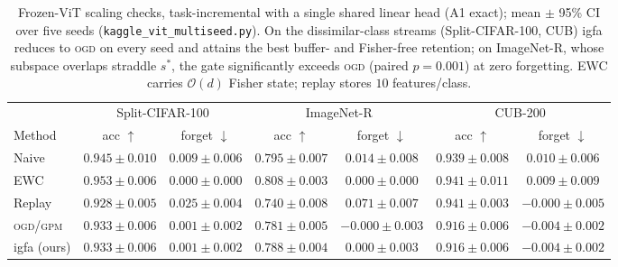 \documentclass[10pt,a4paper]{article}
\theoremstyle{plain}
\theoremstyle{definition}
\newcommand{\sstar}{s^{\ast}}
\newcommand{\IGFA}{igfa}
\newcommand{\OGD}{\textsc{ogd}}
\begin{document}
\begin{table}[tb]\centering\small
\setlength{\tabcolsep}{4pt}
\caption{Frozen-ViT scaling checks, task-incremental with a single shared linear head (A1
exact); mean $\pm$ 95\% CI over five seeds (\texttt{kaggle\_vit\_multiseed.py}). On the
dissimilar-class streams (Split-CIFAR-100, CUB) \IGFA{} reduces to \OGD{} on every seed and
attains the best buffer- and Fisher-free retention; on ImageNet-R, whose subspace overlaps
straddle $\sstar$, the gate significantly exceeds \OGD{} (paired $p=0.001$) at zero
forgetting. EWC carries $\mathcal O(d)$ Fisher state; replay stores $10$ features/class.}
\label{tab:cifar}
\begin{tabular}{lcccccc}
\toprule
 & \multicolumn{2}{c}{Split-CIFAR-100} & \multicolumn{2}{c}{ImageNet-R} & \multicolumn{2}{c}{CUB-200} \\
\cmidrule(lr){2-3}\cmidrule(lr){4-5}\cmidrule(lr){6-7}
Method & acc $\uparrow$ & forget $\downarrow$ & acc $\uparrow$ & forget $\downarrow$ & acc $\uparrow$ & forget $\downarrow$ \\
\midrule
Naive  & $0.945\pm0.010$ & $0.009\pm0.006$ & $0.795\pm0.007$ & $0.014\pm0.008$ & $0.939\pm0.008$ & $0.010\pm0.006$ \\
EWC \cite{kirkpatrick2017} & $0.953\pm0.006$ & $0.000\pm0.000$ & $0.808\pm0.003$ & $0.000\pm0.000$ & $0.941\pm0.011$ & $0.009\pm0.009$ \\
Replay & $0.928\pm0.005$ & $0.025\pm0.004$ & $0.740\pm0.008$ & $0.071\pm0.007$ & $0.941\pm0.003$ & $-0.000\pm0.005$ \\
\OGD{}/\textsc{gpm} \cite{farajtabar2020,saha2021} & $0.933\pm0.006$ & $0.001\pm0.002$ & $0.781\pm0.005$ & $-0.000\pm0.003$ & $0.916\pm0.006$ & $-0.004\pm0.002$ \\
\IGFA{} (ours) & $0.933\pm0.006$ & $0.001\pm0.002$ & $0.788\pm0.004$ & $0.000\pm0.003$ & $0.916\pm0.006$ & $-0.004\pm0.002$ \\
\bottomrule
\end{tabular}
\end{table}
\end{document}
